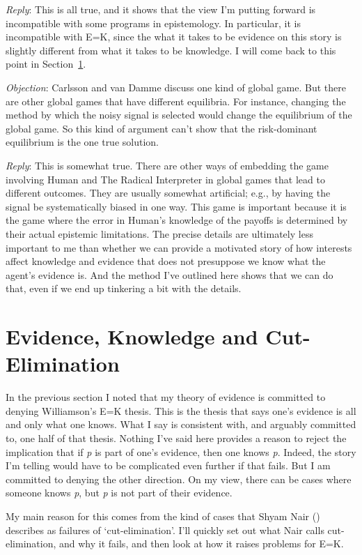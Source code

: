 \documentclass[
  12pt,
  letterpaper,
]{scrbook}
\begin{document}
\emph{Reply}: This is all true, and it shows that the view I'm putting
forward is incompatible with some programs in epistemology. In
particular, it is incompatible with E=K, since the what it takes to be
evidence on this story is slightly different from what it takes to be
knowledge. I will come back to this point in Section~\ref{sec-cutelim}.

\emph{Objection}: Carlsson and van Damme discuss one kind of global
game. But there are other global games that have different equilibria.
For instance, changing the method by which the noisy signal is selected
would change the equilibrium of the global game. So this kind of
argument can't show that the risk-dominant equilibrium is the one true
solution.

\emph{Reply}: This is somewhat true. There are other ways of embedding
the game involving Human and The Radical Interpreter in global games
that lead to different outcomes. They are usually somewhat artificial;
e.g., by having the signal be systematically biased in one way. This
game is important because it is the game where the error in Human's
knowledge of the payoffs is determined by their actual epistemic
limitations. The precise details are ultimately less important to me
than whether we can provide a motivated story of how interests affect
knowledge and evidence that does not presuppose we know what the agent's
evidence is. And the method I've outlined here shows that we can do
that, even if we end up tinkering a bit with the details.

\section{Evidence, Knowledge and Cut-Elimination}\label{sec-cutelim}

In the previous section I noted that my theory of evidence is committed
to denying Williamson's E=K thesis. This is the thesis that says one's
evidence is all and only what one knows. What I say is consistent with,
and arguably committed to, one half of that thesis. Nothing I've said
here provides a reason to reject the implication that if \emph{p} is
part of one's evidence, then one knows \emph{p}. Indeed, the story I'm
telling would have to be complicated even further if that fails. But I
am committed to denying the other direction. On my view, there can be
cases where someone knows \emph{p}, but \emph{p} is not part of their
evidence.

My main reason for this comes from the kind of cases that Shyam Nair
() describes as failures of
`cut-elimination'. I'll quickly set out what Nair calls cut-elimination,
and why it fails, and then look at how it raises problems for E=K.
\end{document}
